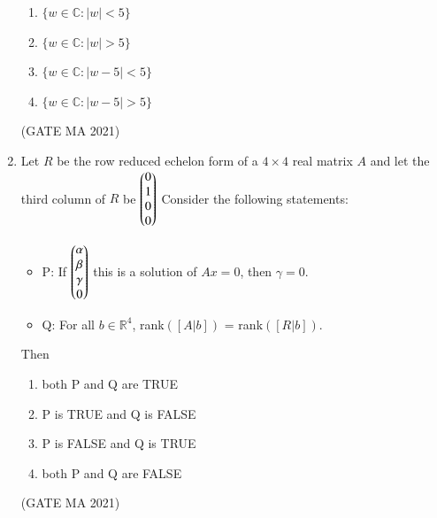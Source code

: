 \documentclass[journal,12pt,onecolumn]{IEEEtran}
\theoremstyle{remark}
\begin{document}
\begin{enumerate}
    \begin{enumerate}
        \item $\{w \in \mathbb{C} : |w| < 5\}$
        \item $\{w \in \mathbb{C} : |w| > 5\}$
        \item $\{w \in \mathbb{C} : |w-5| < 5\}$
        \item $\{w \in \mathbb{C} : |w-5| > 5\}$
    \end{enumerate}
\hfill(GATE MA 2021)
    \item Let $R$ be the row reduced echelon form of a $4 \times 4$ real matrix $A$ and let the third column of $R$ be
    $
    \begin{pmatrix}0 \\
    1 \\
    0 \\
    0
    \end{pmatrix}
    $
    Consider the following statements:
    \begin{itemize}
        \item P: If $\begin{pmatrix}\alpha \\ \beta \\ \gamma \\ 0\end{pmatrix}$ this is a solution of $Ax=0$, then $\gamma=0$.
        \item Q: For all $b \in \mathbb{R}^4$, rank$([A|b])$ = rank$([R|b])$.
    \end{itemize}
    Then
    \begin{enumerate}
        \item both P and Q are TRUE
        \item P is TRUE and Q is FALSE
        \item P is FALSE and Q is TRUE
        \item both P and Q are FALSE
    \end{enumerate}
    \hfill(GATE MA 2021)
    

\end{enumerate}
\end{document}
